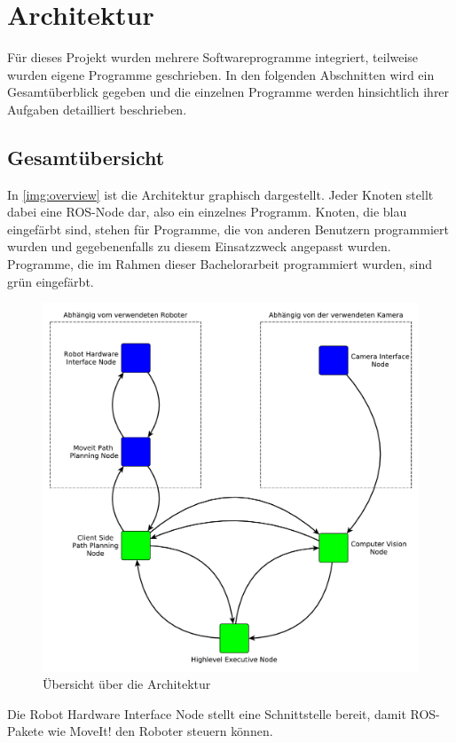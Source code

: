 \chapter{Architektur}
\label{chap:architektur}
Für dieses Projekt wurden mehrere Softwareprogramme integriert, teilweise wurden eigene Programme geschrieben. In den folgenden Abschnitten wird ein Gesamtüberblick gegeben und die einzelnen Programme werden hinsichtlich ihrer Aufgaben detailliert beschrieben.

\section{Gesamtübersicht} %
\label{sec:gesamtübersicht}
In \autoref{img:overview} ist die Architektur graphisch dargestellt. Jeder Knoten stellt dabei eine ROS-Node dar, also ein einzelnes Programm. Knoten, die blau eingefärbt sind, stehen für Programme, die von anderen Benutzern programmiert wurden und gegebenenfalls zu diesem Einsatzzweck angepasst wurden. Programme, die im Rahmen dieser Bachelorarbeit programmiert wurden, sind grün eingefärbt.
\begin{figure}[!hbt]
	\centering
	\vspace{1ex}
	\includegraphics[scale=0.6]{../images/overview}
	\caption[Übersicht über die Architektur. Die Pfeile verdeutlichen die Kommunikation zwischen den Knoten.]{\label{img:overview} Übersicht über die Architektur}
	\vspace{1ex}
\end{figure}
Die Robot Hardware Interface Node stellt eine Schnittstelle bereit, damit ROS-Pakete wie MoveIt! den Roboter steuern können.


